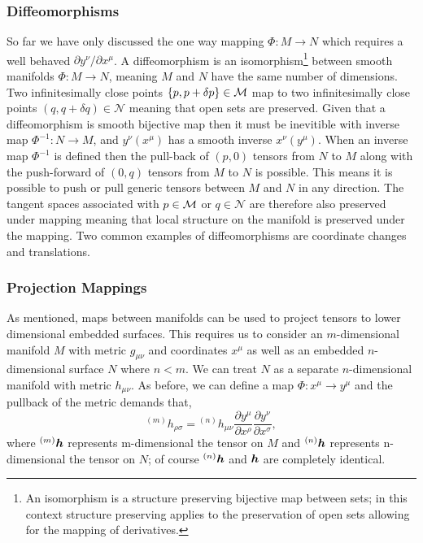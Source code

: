 \subsubsection{Diffeomorphisms}
So far we have only discussed the one way mapping $\Phi :M \rightarrow N$ which
requires a well behaved $\partial y^\nu / \partial x^\mu$. A diffeomorphism is an
isomorphism\footnote{An isomorphism is a structure
preserving bijective map between sets; in this context structure preserving applies
to the preservation of open sets allowing for the mapping of derivatives.}
between smooth manifolds $\Phi :M \rightarrow N$,
meaning $M$ and $N$ have the same number of dimensions. Two infinitesimally close
points $\{p,p+\delta p\}\in\mathcal{M}$ map to two infinitesimally close points
$(q,q+\delta q)\in\mathcal{N}$ meaning that open sets are preserved. Given that
a diffeomorphism is smooth bijective map then it must be inevitible with inverse
map $\Phi^{-1}:N \rightarrow M$, and $y^\nu(x^\mu)$ has a smooth inverse $x^\nu(y^\mu)$.
When an inverse map $\Phi^{-1}$ is defined then the pull-back of $(p,0)$ tensors
from $N$ to $M$ along with the push-forward of $(0,q)$ tensors from $M$ to $N$ is
possible. This means it is possible to push or pull generic tensors between $M$
and $N$ in any direction. The tangent spaces associated with $p \in \mathcal{M}$ or $q \in \mathcal{N}$
are therefore also preserved under mapping meaning that local structure on the
manifold is preserved under the mapping. Two common examples of diffeomorphisms
are coordinate changes and translations.

\subsubsection{Projection Mappings}
As mentioned, maps between manifolds can be used to project tensors to lower dimensional embedded surfaces. This requires us to consider an $m$-dimensional manifold $M$ with metric $g_{\mu\nu}$ and coordinates $x^\mu$ as well as an embedded $n$-dimensional surface $N$ where $n<m$. We can treat $N$ as a separate $n$-dimensional manifold with metric $h_{\mu\nu}$. As before, we can define a map $\Phi:x^\mu \rightarrow y^\mu$ and the pullback of the metric demands that,
\begin{equation}
{}^{(m)}h_{\rho\sigma} = {}^{(n)}h_{\mu\nu}\frac{\partial y^\mu  }{\partial x^\rho  } \frac{\partial y^\nu  }{\partial x^\sigma  },
\end{equation}
where ${}^{(m)}\boldsymbol{h}$ represents m-dimensional the tensor on $M$ and ${}^{(n)}\boldsymbol{h}$ represents n-dimensional the tensor on $N$; of course ${}^{(n)}\boldsymbol{h}$ and $\boldsymbol{h}$ are completely identical.


